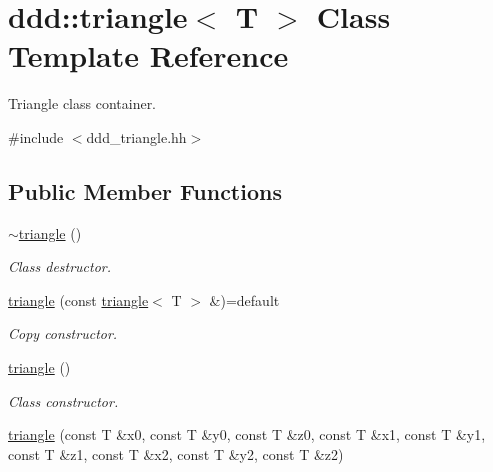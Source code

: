 \hypertarget{classddd_1_1triangle}{}\section{ddd\+:\+:triangle$<$ T $>$ Class Template Reference}
\label{classddd_1_1triangle}


Triangle class container.  




{\ttfamily \#include $<$ddd\+\_\+triangle.\+hh$>$}

\subsection*{Public Member Functions}
\begin{DoxyCompactItemize}
\item 
\mbox{\label{classddd_1_1triangle_ae17a51e842e44cfb3061bdca7e64bc11}} 
\hyperlink{classddd_1_1triangle_ae17a51e842e44cfb3061bdca7e64bc11}{$\sim$triangle} ()
\begin{DoxyCompactList}\small\item\em Class destructor. \end{DoxyCompactList}\item 
\mbox{\label{classddd_1_1triangle_a3f1ab930b26ec606d8979a9c191a2722}} 
\hyperlink{classddd_1_1triangle_a3f1ab930b26ec606d8979a9c191a2722}{triangle} (const \hyperlink{classddd_1_1triangle}{triangle}$<$ T $>$ \&)=default
\begin{DoxyCompactList}\small\item\em Copy constructor. \end{DoxyCompactList}\item 
\mbox{\label{classddd_1_1triangle_a245e40512a611b62c33cc540ac0478ba}} 
\hyperlink{classddd_1_1triangle_a245e40512a611b62c33cc540ac0478ba}{triangle} ()
\begin{DoxyCompactList}\small\item\em Class constructor. \end{DoxyCompactList}\item 
\mbox{\label{classddd_1_1triangle_ad19b3fc3d0a7997a6ab0400901743190}} 
\hyperlink{classddd_1_1triangle_ad19b3fc3d0a7997a6ab0400901743190}{triangle} (const T \&x0, const T \&y0, const T \&z0, const T \&x1, const T \&y1, const T \&z1, const T \&x2, const T \&y2, const T \&z2)

\end{DoxyCompactItemize}
